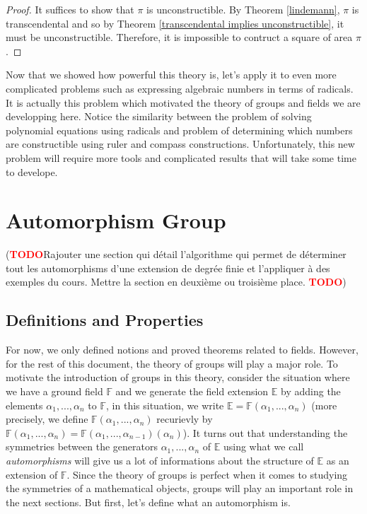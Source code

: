 \documentclass{article}
\theoremstyle{plain}
\theoremstyle{definition}
\newcommand{\F}{\mathbb{F}}
\newcommand{\E}{\mathbb{E}}
\newcommand{\td}{\textcolor{red}{\textbf{TODO}}}
\begin{document}
\begin{proof}
    It suffices to show that $\pi$ is unconstructible. By Theorem \ref{lindemann}, $\pi$ is transcendental and so by Theorem \ref{transcendental implies unconstructible}, it must be unconstructible. Therefore, it is impossible to contruct a square of area $\pi$. 
\end{proof}

Now that we showed how powerful this theory is, let's apply it to even more complicated problems such as expressing algebraic numbers in terms of radicals. It is actually this problem which motivated the theory of groups and fields we are developping here. Notice the similarity between the problem of solving polynomial equations using radicals and problem of determining which numbers are constructible using ruler and compass constructions. Unfortunately, this new problem will require more tools and complicated results that will take some time to develope.

\section{Automorphism Group}

(\td Rajouter une section qui détail l'algorithme qui permet de déterminer tout les automorphisms d'une extension de degrée finie et l'appliquer à des exemples du cours. Mettre la section en deuxième ou troisième place. \td)

\subsection{Definitions and Properties}

For now, we only defined notions and proved theorems related to fields. However, for the rest of this document, the theory of groups will play a major role. To motivate the introduction of groups in this theory, consider the situation where we have a ground field $\F$ and we generate the field extension $\E$ by adding the elements $\alpha_1, ..., \alpha_n$ to $\F$, in this situation, we write $\E = \F(\alpha_1, ..., \alpha_n)$ (more precisely, we define $\F(\alpha_1, ..., \alpha_n)$ recurievly by $\F(\alpha_1, ..., \alpha_n) = \F(\alpha_1, ..., \alpha_{n-1})(\alpha_n)$). It turns out that understanding the symmetries between the generators $\alpha_1, ..., \alpha_n$ of $\E$ using what we call \textit{automorphisms} will give us a lot of informations about the structure of $\E$ as an extension of $\F$. Since the theory of groups is perfect when it comes to studying the symmetries of a mathematical objects, groups will play an important role in the next sections. But first, let's define what an automorphism is.
\end{document}

